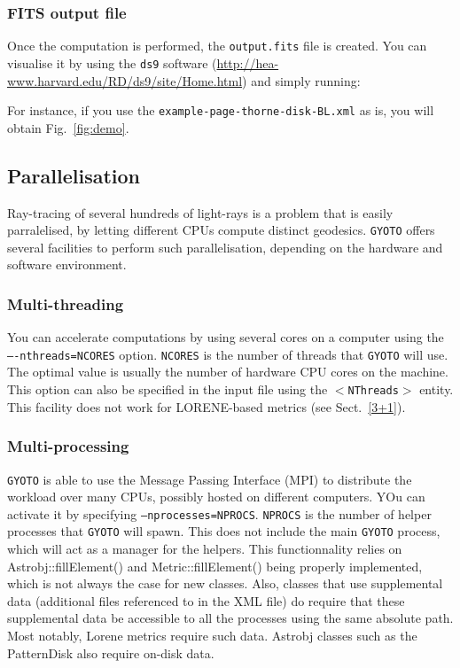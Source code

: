 \documentclass[a4paper,12pt]{article}
\begin{document}
\subsubsection{FITS output file}

Once the computation is performed, the \texttt{output.fits} file is created. You can visualise it by using the \texttt{ds9} software (\url{http://hea-www.harvard.edu/RD/ds9/site/Home.html}) and simply running:


For instance, if you use the \texttt{example-page-thorne-disk-BL.xml} as is, you will obtain Fig.~\ref{fig:demo}.

\subsection{Parallelisation}

Ray-tracing of several hundreds of light-rays is a problem that is
easily parralelised, by letting different CPUs compute distinct
geodesics. \texttt{GYOTO} offers several facilities to perform such
parallelisation, depending on the hardware and software environment.

\subsubsection{Multi-threading}

You can accelerate computations by using several cores on a computer
using the \texttt{----nthreads=NCORES} option. \texttt{NCORES} is the
number of threads that \texttt{GYOTO} will use. The optimal value is
usually the number of hardware CPU cores on the machine. This option
can also be specified in the input file using the
\texttt{$<$NThreads$>$} entity. This facility does not work for
LORENE-based metrics (see Sect.~\ref{3+1}).

\subsubsection{Multi-processing}

\texttt{GYOTO} is able to use the Message Passing Interface (MPI) to
distribute the workload over many CPUs, possibly hosted on different
computers. YOu can activate it by specifying
\texttt{--nprocesses=NPROCS}. \texttt{NPROCS} is the number of helper
processes that \texttt{GYOTO} will spawn. This does not include the
main \texttt{GYOTO} process, which will act as a manager for the
helpers. This functionnality relies on Astrobj::fillElement() and
Metric::fillElement() being properly implemented, which is not always
the case for new classes. Also, classes that use supplemental data
(additional files referenced to in the XML file) do require that these
supplemental data be accessible to all the processes using the same
absolute path. Most notably, Lorene metrics require such data. Astrobj
classes such as the PatternDisk also require on-disk data.
\end{document}
